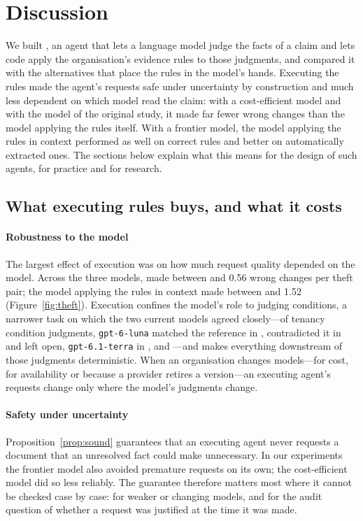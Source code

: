 \section{Discussion}
\label{sec:discussion}

We built \casepath, an agent that lets a language model judge the facts of a claim and lets code apply the organisation's evidence rules to those judgments, and compared it with the alternatives that place the rules in the model's hands. Executing the rules made the agent's requests safe under uncertainty by construction and much less dependent on which model read the claim: with a cost-efficient model and with the model of the original study, it made far fewer wrong changes than the model applying the rules itself. With a frontier model, the model applying the rules in context performed as well on correct rules and better on automatically extracted ones. The sections below explain what this means for the design of such agents, for practice and for research.

\subsection{What executing rules buys, and what it costs}
\label{sec:buys}

\paragraph{Robustness to the model}
The largest effect of execution was on how much request quality depended on the model. Across the three models, \casepath made between \thLunaCPWrongPP{} and 0.56 wrong changes per theft pair; the model applying the rules in context made between \thTerraRWrongPP{} and 1.52 (Figure~\ref{fig:theft}). Execution confines the model's role to judging conditions, a narrower task on which the two current models agreed closely---of \jaTotal{} tenancy condition judgments, \texttt{gpt-6-luna} matched the reference in \jaLunaCorrect, contradicted it in \jaLunaFlipped{} and left \jaLunaUnres{} open, \texttt{gpt-6.1-terra} in \jaCorrect, \jaFlipped{} and \jaUnres---and makes everything downstream of those judgments deterministic. When an organisation changes models---for cost, for availability or because a provider retires a version---an executing agent's requests change only where the model's judgments change.

\paragraph{Safety under uncertainty}
Proposition~\ref{prop:sound} guarantees that an executing agent never requests a document that an unresolved fact could make unnecessary. In our experiments the frontier model also avoided premature requests on its own; the cost-efficient model did so less reliably. The guarantee therefore matters most where it cannot be checked case by case: for weaker or changing models, and for the audit question of whether a request was justified at the time it was made.

